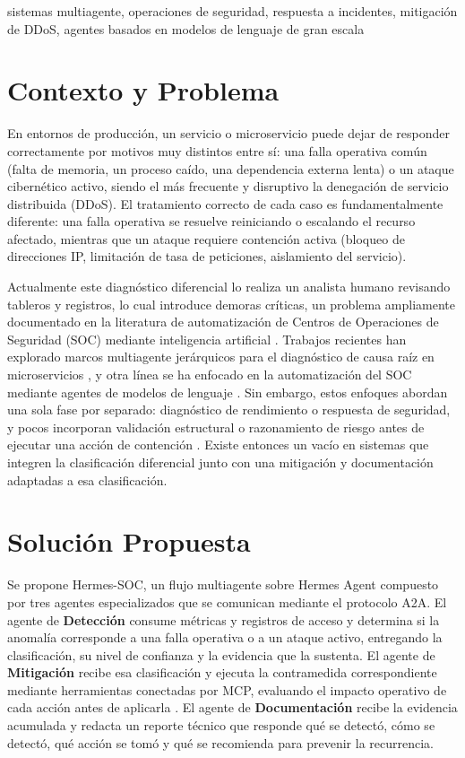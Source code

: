 \documentclass[conference]{IEEEtran}
\begin{document}
\begin{IEEEkeywords}
sistemas multiagente, operaciones de seguridad, respuesta a incidentes, mitigación
de DDoS, agentes basados en modelos de lenguaje de gran escala
\end{IEEEkeywords}

\section{Contexto y Problema}
En entornos de producción, un servicio o microservicio puede dejar de responder
correctamente por motivos muy distintos entre sí: una falla operativa común (falta
de memoria, un proceso caído, una dependencia externa lenta) o un ataque cibernético
activo, siendo el más frecuente y disruptivo la denegación de servicio distribuida
(DDoS). El tratamiento correcto de cada caso es fundamentalmente diferente: una
falla operativa se resuelve reiniciando o escalando el recurso afectado, mientras
que un ataque requiere contención activa (bloqueo de direcciones IP, limitación de
tasa de peticiones, aislamiento del servicio).

Actualmente este diagnóstico diferencial lo realiza un analista humano revisando
tableros y registros, lo cual introduce demoras críticas, un problema ampliamente
documentado en la literatura de automatización de Centros de Operaciones de
Seguridad (SOC) mediante inteligencia artificial \cite{khayat2025}. Trabajos
recientes han explorado marcos multiagente jerárquicos para el diagnóstico de causa
raíz en microservicios \cite{kataria2025}, y otra línea se ha enfocado en la
automatización del SOC mediante agentes de modelos de lenguaje \cite{srinivas2025,
saju2026}. Sin embargo, estos enfoques abordan una sola fase por separado:
diagnóstico de rendimiento o respuesta de seguridad, y pocos incorporan validación
estructural o razonamiento de riesgo antes de ejecutar una acción de contención
\cite{roy2026}. Existe entonces un vacío en sistemas que integren la clasificación
diferencial junto con una mitigación y documentación adaptadas a esa clasificación.

\section{Solución Propuesta}
Se propone Hermes-SOC, un flujo multiagente sobre Hermes Agent compuesto por tres
agentes especializados que se comunican mediante el protocolo A2A. El agente de
\textbf{Detección} consume métricas y registros de acceso y determina si la anomalía
corresponde a una falla operativa o a un ataque activo, entregando la clasificación,
su nivel de confianza y la evidencia que la sustenta. El agente de
\textbf{Mitigación} recibe esa clasificación y ejecuta la contramedida
correspondiente mediante herramientas conectadas por MCP, evaluando el impacto
operativo de cada acción antes de aplicarla \cite{roy2026}. El agente de
\textbf{Documentación} recibe la evidencia acumulada y redacta un reporte técnico
que responde qué se detectó, cómo se detectó, qué acción se tomó y qué se recomienda
para prevenir la recurrencia.
\end{document}
